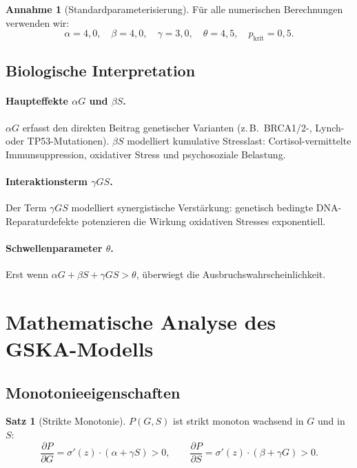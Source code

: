 ﻿\documentclass[12pt, a4paper]{article}
\theoremstyle{definition}
\newtheorem{satz}[definition]{Satz}
\newtheorem{annahme}[definition]{Annahme}
\theoremstyle{remark}
\begin{document}
\begin{annahme}[Standardparameterisierung]
\label{annahme:parameter}
Für alle numerischen Berechnungen verwenden wir:
\[
  \alpha = 4{,}0,\quad \beta = 4{,}0,\quad \gamma = 3{,}0,\quad
  \theta = 4{,}5,\quad p_{\mathrm{krit}} = 0{,}5.
\]
\end{annahme}

\subsection{Biologische Interpretation}

\paragraph{Haupteffekte $\alpha G$ und $\beta S$.}
$\alpha G$ erfasst den direkten Beitrag genetischer Varianten (z.\,B.\ BRCA1/2-,
Lynch- oder TP53-Mutationen). $\beta S$ modelliert kumulative Stresslast:
Cortisol-vermittelte Immunsuppression, oxidativer Stress und psychosoziale Belastung.

\paragraph{Interaktionsterm $\gamma GS$.}
Der Term $\gamma GS$ modelliert synergistische Verstärkung: genetisch bedingte
DNA-Reparaturdefekte potenzieren die Wirkung oxidativen Stresses exponentiell.

\paragraph{Schwellenparameter $\theta$.}
Erst wenn $\alpha G + \beta S + \gamma GS > \theta$, überwiegt die Ausbruchswahrscheinlichkeit.


\section{Mathematische Analyse des GSKA-Modells}
\label{sec:analyse}


\subsection{Monotonieeigenschaften}

\begin{satz}[Strikte Monotonie]
\label{satz:monotonie}
$P(G,S)$ ist strikt monoton wachsend in $G$ und in $S$:
\[
  \frac{\partial P}{\partial G} = \sigma'(z)\cdot(\alpha + \gamma S) > 0,
  \qquad
  \frac{\partial P}{\partial S} = \sigma'(z)\cdot(\beta + \gamma G) > 0.
\]
\end{satz}
\end{document}
